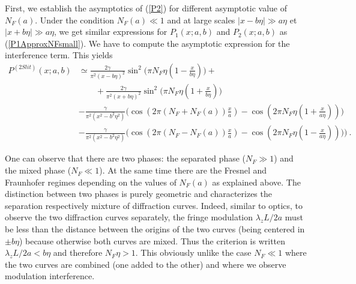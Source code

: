 \documentclass[12pt]{article}   %
\begin{document}
First, we establish the asymptotics of (\ref{P2}) for different
asymptotic value of $N_F(a)$. Under the condition $N_F(a)\ll 1$
and at large scales $|x-b\eta|\gg a\eta$ et $|x+b\eta|\gg
a\eta$, we get  similar expressions for $P_1(x;a,b)$ and
$P_2(x;a,b)$ as (\ref{P1ApproxNFsmall}). We have to compute the
asymptotic expression for the interference term. This yields
\begin{align}\label{P2slApprox}
P^{(2 Slit)}(x;a,b)&\simeq\frac{2\gamma}{\pi^2 (x-b\eta)^2}
\sin^2{\bigl(\pi N_F\eta(1-\frac{x}{b\eta})\bigr)}
+\nonumber\\ & \qquad + \frac{2\gamma}{\pi^2 (x+b\eta)^2} \sin^2{\bigl(\pi
N_F\eta(1+\frac{x}{b\eta})\bigr)}
{}\nonumber\\{}&-\frac{\gamma}{\pi^2 (x^2-b^2\eta^2)}
\bigl(\cos{(2\pi (N_F+N_F(a))\frac{x}{a})}- \cos{(2\pi
N_F\eta(1+\frac{x}{a\eta}))}\bigr)
{}\nonumber\\{}&-\frac{\gamma}{\pi^2 (x^2-b^2\eta^2)}
\bigl(\cos{(2\pi (N_F-N_F(a))\frac{x}{a})}-\cos{(2\pi
N_F\eta(1-\frac{x}{a\eta}))}) \bigr)\ .
\end{align}


One can observe that there are two phases: the
separated phase ($N_F\gg 1$) and the mixed phase ($N_F\ll 1$). At
the same time there are the Fresnel and Fraunhofer regimes
depending on the values of $N_F(a)$ as explained above. The
distinction between two phases is purely geometric and
characterizes the separation respectively mixture of diffraction
curves. Indeed, similar to optics, to observe the two diffraction
curves separately, the fringe modulation $\lambda_z L/2a$ must be
less than the distance between the origins of the two curves
(being centered in $\pm b\eta$) because otherwise both curves are
mixed. Thus the criterion is written $ \lambda_z L/2a < b\eta $
and therefore $N_F\eta > 1$. This obviously unlike the case $ N_F
\ll 1 $ where the two curves are combined (one added to the other)
and where we observe modulation interference. %
\end{document}
